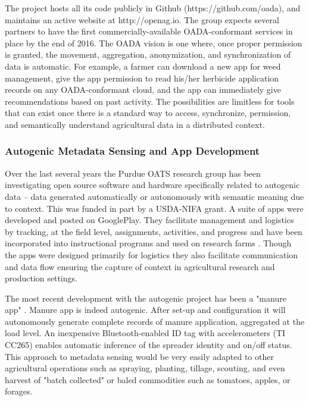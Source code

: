 \documentclass[11pt]{article}
\begin{document}
The project hosts all its code publicly in Github (https://github.com/oada), and maintains an active website at http://openag.io.  
The group expects several partners to have the first commercially-available OADA-conformant services in place by the end of 2016.
The OADA vision is one where, once proper permission is granted, the movement, aggregation, anonymization, and synchronization 
of data is automatic.  For example, a farmer can download a new app for weed management, give the app permission to read his/her 
herbicide application records on any OADA-conformant cloud, and the app can immediately give recommendations based on 
past activity. The possibilities are limitless for tools that can exist once there is a standard way to access, synchronize, permission, 
and semantically understand agricultural data in a distributed context.
 
\subsubsection{Autogenic Metadata Sensing and App Development}   

Over the last several years the Purdue OATS research group has been investigating open source software and 
hardware specifically related to autogenic data -- data generated automatically or autonomously with semantic meaning 
due to context. This was funded in part by a USDA-NIFA grant. A suite of apps were developed and posted on GooglePlay. 
They facilitate management and logistics by tracking, at the field level, assignments, activities, and progress and have 
been incorporated into instructional programs and used on research farms \cite{Welte:14a,Welte:14b}. Though the apps were 
designed primarily for logistics they also facilitate communication and data flow ensuring the capture of context in 
agricultural research and production settings.

 The most recent development with the autogenic project has been a "manure app" \cite{Koester:15}.  Manure app is indeed 
autogenic. After set-up and configuration it will autonomously generate complete records of manure application, aggregated 
at the load level.  An inexpensive Bluetooth-enabled ID tag with accelerometers (TI CC265) enables automatic inference 
of the spreader identity and on/off status.  This approach to metadata sensing would be very easily adapted to other 
agricultural operations such as spraying, planting, tillage, scouting, and even harvest of "batch collected" or baled 
commodities such as tomatoes, apples, or forages. 
	 
\end{document}
